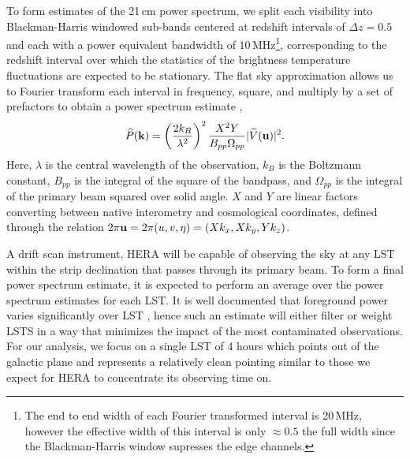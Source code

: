 \documentclass[twocolumn]{emulateapj}
\begin{document}
To form estimates of the 21\,cm power spectrum, we split each visibility into Blackman-Harris windowed sub-bands centered at redshift intervals of $\Delta z = 0.5$ and each with a power equivalent bandwidth of $10$\,MHz\footnote{The end to end width of each Fourier transformed interval is 20\,MHz, however the effective width of this interval is only $\approx 0.5$ the full width since the Blackman-Harris window supresses the edge channels.}, corresponding to the redshift interval over which the statistics of the brightness temperature fluctuations are expected to be stationary. The flat sky approximation allows us to Fourier transform each interval in frequency, square, and multiply by a set of prefactors to obtain a power spectrum estimate \citep{Parsons:2014},
\begin{equation}\label{eq:PS}
\widehat{P}({\bf k}) = \left( \frac{2 k_B}{\lambda^2} \right)^2 \frac{X^2 Y}{B_{pp} \Omega_{pp}} | \widetilde{V}({\bf u}) |^2.
\end{equation}
Here, $\lambda$ is the central wavelength of the observation, $k_B$ is the Boltzmann constant, $B_{pp}$ is the integral of the square of the bandpass, and $\Omega_{pp}$ is the integral of the primary beam squared over solid angle. $X$ and $Y$ are linear factors converting between native interometry and cosmological coordinates, defined through the relation $2 \pi {\bf u}=2 \pi (u,v,\eta) = (X k_x, X k_y, Y k_z)$. 

A drift scan instrument, HERA will be capable of observing the sky at any LST within the strip declination that passes through its primary beam. To form a final power spectrum estimate, it is expected to perform an average over the power spectrum estimates for each LST. It is well documented that foreground power varies significantly over LST \citep{Thyagarajan:2015a}, hence such an estimate will either filter or weight LSTS in a way that minimizes the impact of the most contaminated observations. For our analysis, we focus on a single LST of 4 hours which points out of the galactic plane and represents a relatively clean pointing similar to those we expect for HERA to concentrate its observing time on.  
\end{document}
